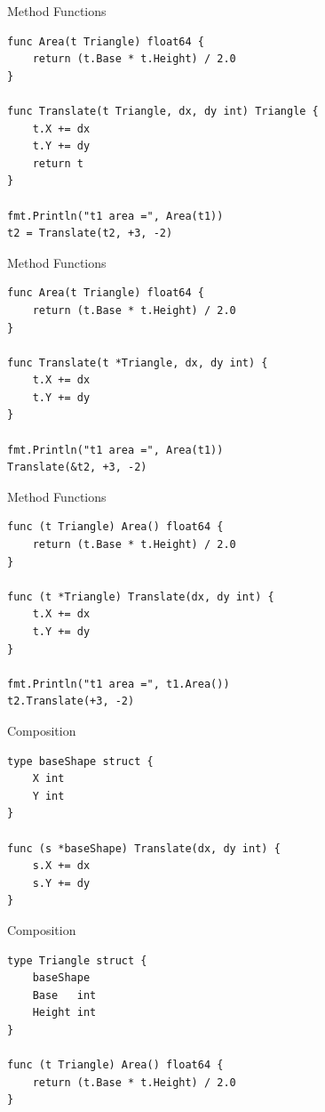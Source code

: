 \documentclass[pdf]{beamer}
\begin{document}
\begin{frame}[fragile]{Method Functions}
\begin{lstlisting}
func Area(t Triangle) float64 {
    return (t.Base * t.Height) / 2.0
}

func Translate(t Triangle, dx, dy int) Triangle {
    t.X += dx
    t.Y += dy
    return t
}

fmt.Println("t1 area =", Area(t1))
t2 = Translate(t2, +3, -2)
\end{lstlisting}
\end{frame}

\begin{frame}[fragile]{Method Functions}
\begin{lstlisting}
func Area(t Triangle) float64 {
    return (t.Base * t.Height) / 2.0
}

func Translate(t *Triangle, dx, dy int) {
    t.X += dx
    t.Y += dy
}

fmt.Println("t1 area =", Area(t1))
Translate(&t2, +3, -2)
\end{lstlisting}
\end{frame}

\begin{frame}[fragile]{Method Functions}
\begin{lstlisting}
func (t Triangle) Area() float64 {
    return (t.Base * t.Height) / 2.0
}

func (t *Triangle) Translate(dx, dy int) {
    t.X += dx
    t.Y += dy
}

fmt.Println("t1 area =", t1.Area())
t2.Translate(+3, -2)
\end{lstlisting}
\end{frame}

\begin{frame}[fragile]{Composition}
\begin{lstlisting}
type baseShape struct {
    X int
    Y int
}

func (s *baseShape) Translate(dx, dy int) {
    s.X += dx
    s.Y += dy
}
\end{lstlisting}
\end{frame}

\begin{frame}[fragile]{Composition}
\begin{lstlisting}
type Triangle struct {
    baseShape
    Base   int
    Height int
}

func (t Triangle) Area() float64 {
    return (t.Base * t.Height) / 2.0
}
\end{lstlisting}
\end{frame}
\end{document}
